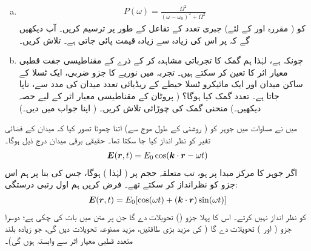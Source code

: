 \begin{enumerate}[a.]
 
\item
{}
\begin{align}
	P(\omega) = \frac{\Omega^2}{(\omega-\omega_0)^2+\Omega^2}
\end{align}
کو ( مقررہ   اور  کے لئے)    جبری  تعدد  کے تفاعل کے طور پر ترسیم کریں۔ آپ دیکھیں گے کہ  پر اس کی زیادہ سے زیادہ قیمت پائی جاتی ہے۔   تلاش کریں۔
\item
 چونکہ  ہے،  لہٰذا ہم  گمک کا تجرباتی  مشاہدہ کر کے ذرے  کے  مقناطیسی جفت قطبی  معیار اثر کا  تعین کر سکتے ہیں۔   تجربہ میں نوریے  کا  جزو ضربی،  ایک ٹسلا  کے ساکن میدان اور ایک مائیکرو  ٹسلا   حیطے  کے ریڈیائی تعدد میدان کی مدد سے،  ناپا جاتا ہے۔ تعدد گمک کیا ہوگا؟ ( پروٹان کے  مقناطیسی معیار اثر کے لیے حصہ   دیکھیں۔) منحنی گمک کی چوڑائی تلاش کریں۔ ( اپنا جواب  میں دیں۔)
 \end{enumerate}
میں نے مساوات   میں  جوہر کو (  روشنی کے  طول موج  سے) اتنا چھوٹا تصور کیا  کہ میدان کے  فضائی تغیر کو نظر انداز کیا جا سکتا تھا۔ حقیقی برقی میدان درج ذیل ہوگا۔
\begin{align}
{\ensuremath{{\boldsymbol{E}}}}({{\boldsymbol{r}}},t) = E_0\cos({{\boldsymbol{k}}}\cdot {\ensuremath{{\boldsymbol{r}}}}-\omega t)
\end{align}
اگر جوہر کا مرکز مبدا پر ہو،  تب  متعلقہ حجم پر  
( لہٰذا  )   ہوگا،  جس کی بنا پر ہم اس جزو کو نظرانداز کر سکتے تھے۔ فرض کریں ہم  اول رتبی  درستگی:
\begin{align}
{\ensuremath{{\boldsymbol{E}}}}({{\boldsymbol{r}}},t) = E_0[\cos(\omega t)+({{\boldsymbol{k}}}\cdot{\ensuremath{{\boldsymbol{r}}}})\sin(\omega t)]
\end{align}
کو نظر انداز نہیں کرتے۔ اس کا  پہلا جزو   ()   تحویلات  دے گا  جن پر متن میں بات کی چکی ہے؛  دوسرا جزو  (    اور  ) تحویلات دے گا   (  کی  مزید  بڑی طاقتیں،  مزید  ممنوعہ تحویلات  دیں  گی،  جو زیادہ بلند متعدد قطبی معیار اثر سے  وابستہ ہوں گی)۔
